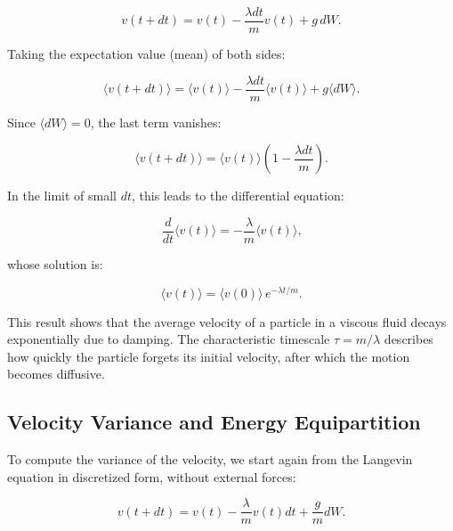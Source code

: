 \begin{equation}
  v(t + dt) = v(t) - \frac{\lambda dt}{m} v(t) + g\, dW\text{.}
  \label{eq:noforce}
\end{equation}

Taking the expectation value (mean) of both sides:

\begin{equation}
  \langle v(t + dt) \rangle = \langle v(t) \rangle - \frac{\lambda dt}{m} \langle v(t) \rangle + g \langle dW \rangle\text{.}
  \label{eq:mean}
\end{equation}

Since $\langle dW \rangle = 0$, the last term vanishes:

\begin{equation}
  \langle v(t + dt) \rangle = \langle v(t) \rangle \left( 1 - \frac{\lambda dt}{m} \right)\text{.}
\end{equation}

In the limit of small $dt$, this leads to the differential equation:

\begin{equation}
  \frac{d}{dt} \langle v(t) \rangle = - \frac{\lambda}{m} \langle v(t) \rangle\text{,}
  \label{eq:derivative}
\end{equation}

whose solution is:

\begin{equation}
  \langle v(t) \rangle = \langle v(0) \rangle\, e^{-\lambda t / m}\text{.}
\end{equation}

This result shows that the average velocity of a particle in a viscous fluid decays exponentially due to damping. The characteristic timescale $\tau = m/\lambda$ describes how quickly the particle forgets its initial velocity, after which the motion becomes diffusive.


\subsection{Velocity Variance and Energy Equipartition}

To compute the variance of the velocity, we start again from the Langevin equation in discretized form, without external forces:

\begin{equation}
  v(t + dt) = v(t) - \frac{\lambda}{m} v(t) dt + \frac{g}{m} dW \text{.}
\end{equation}

